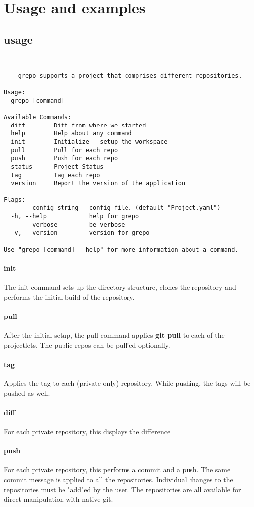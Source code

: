 \documentclass[11pt, a4paper]{article} %
\begin{document}
\section{Usage and examples}

\subsection{usage}

\begin{lstlisting}

    
	grepo supports a project that comprises different repositories.

Usage:
  grepo [command]

Available Commands:
  diff        Diff from where we started
  help        Help about any command
  init        Initialize - setup the workspace
  pull        Pull for each repo
  push        Push for each repo
  status      Project Status
  tag         Tag each repo
  version     Report the version of the application

Flags:
      --config string   config file. (default "Project.yaml")
  -h, --help            help for grepo
      --verbose         be verbose
  -v, --version         version for grepo

Use "grepo [command] --help" for more information about a command.

\end{lstlisting}

\paragraph{init} The init command sets up the directory structure, clones the repository and performs the initial build of the repository.
\paragraph{pull} After the initial setup, the pull command applies \textbf{git pull} to each of the projectlets. The public repos can be pull'ed optionally.
\paragraph{tag} Applies the tag to each (private only) repository. While pushing, the tags will be pushed as well.
\paragraph{diff} For each private repository, this displays the difference
\paragraph{push} For each private repository, this performs a commit and a push. The same commit message is applied to all the repositories. Individual changes to the repositories must be "add"ed by the
user. The repositories are all available for direct manipulation with native git.
\end{document}
